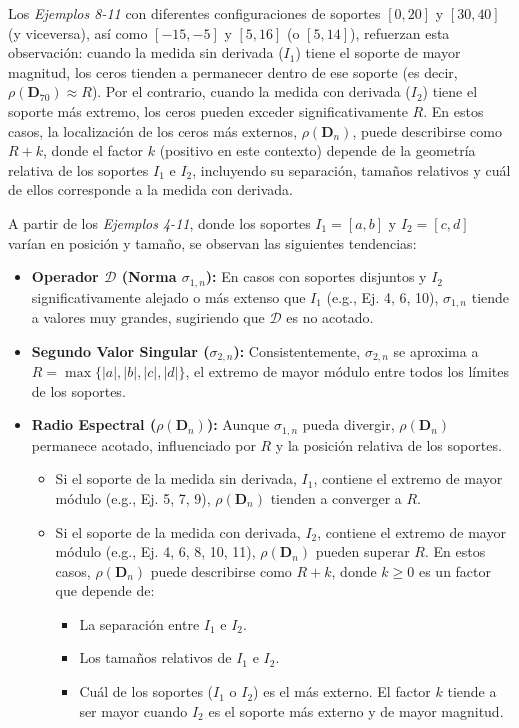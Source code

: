 Los \textit{Ejemplos 8-11} con diferentes configuraciones de soportes $[0,20]$ y $[30,40]$ (y viceversa), así como $[-15,-5]$ y $[5,16]$ (o $[5,14]$), refuerzan esta observación: cuando la medida sin derivada ($I_1$) tiene el soporte de mayor magnitud, los ceros tienden a permanecer dentro de ese soporte (es decir, $\rho(\mathbf{D}_{70}) \approx R$). Por el contrario, cuando la medida con derivada ($I_2$) tiene el soporte más extremo, los ceros pueden exceder significativamente $R$. En estos casos, la localización de los ceros más externos, $\rho(\mathbf{D}_n)$, puede describirse como $R + k$, donde el factor $k$ (positivo en este contexto) depende de la geometría relativa de los soportes $I_1$ e $I_2$, incluyendo su separación, tamaños relativos y cuál de ellos corresponde a la medida con derivada.

A partir de los \textit{Ejemplos 4-11}, donde los soportes $I_1=[a,b]$ y $I_2=[c,d]$ varían en posición y tamaño, se observan las siguientes tendencias:
\begin{itemize}
	\item \textbf{Operador $\mathcal{D}$ (Norma $\sigma_{1,n}$):} En casos con soportes disjuntos y $I_2$ significativamente alejado o más extenso que $I_1$ (e.g., Ej. 4, 6, 10), $\sigma_{1,n}$ tiende a valores muy grandes, sugiriendo que $\mathcal{D}$ es no acotado.
	\item \textbf{Segundo Valor Singular ($\sigma_{2,n}$):} Consistentemente, $\sigma_{2,n}$ se aproxima a $R = \max\{|a|,|b|,|c|,|d|\}$, el extremo de mayor módulo entre todos los límites de los soportes.
	\item \textbf{Radio Espectral ($\rho(\mathbf{D}_n)$):} Aunque $\sigma_{1,n}$ pueda divergir, $\rho(\mathbf{D}_n)$ permanece acotado, influenciado por $R$ y la posición relativa de los soportes.
	      \begin{itemize}
		      \item Si el soporte de la medida sin derivada, $I_1$, contiene el extremo de mayor módulo (e.g., Ej. 5, 7, 9), $\rho(\mathbf{D}_n)$ tienden a converger a $R$.
		      \item Si el soporte de la medida con derivada, $I_2$, contiene el extremo de mayor módulo (e.g., Ej. 4, 6, 8, 10, 11), $\rho(\mathbf{D}_n)$ pueden superar $R$. En estos casos, $\rho(\mathbf{D}_n)$ puede describirse como $R + k$, donde $k \ge 0$ es un factor que depende de:
		            \begin{itemize}
			            \item La separación entre $I_1$ e $I_2$.
			            \item Los tamaños relativos de $I_1$ e $I_2$.
			            \item Cuál de los soportes ($I_1$ o $I_2$) es el más externo. El factor $k$ tiende a ser mayor cuando $I_2$ es el soporte más externo y de mayor magnitud.
		            \end{itemize}
	      \end{itemize}
\end{itemize}

